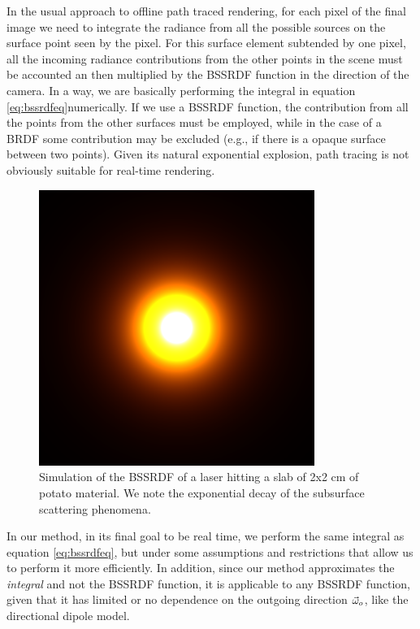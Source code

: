 In the usual approach to offline path traced rendering, for each pixel of the final image we need to integrate the radiance from all the possible sources on the surface point seen by the pixel. For this surface element subtended by one pixel, all the incoming radiance contributions from the other points in the scene must be accounted an then multiplied by the BSSRDF function in the direction of the camera. In a way, we are basically performing the integral in equation \ref{eq:bssrdfeq}numerically. If we use a BSSRDF function, the contribution from all the points from the other surfaces must be employed, while in the case of a BRDF some contribution may be excluded (e.g., if there is a opaque surface between two points). Given its natural exponential explosion, path tracing is not obviously suitable for real-time rendering.


\begin{figure}[!ht]
\centering
\includegraphics[width=0.8\textwidth]{images/bssrdf_slab_potato.png}
\caption{Simulation of the BSSRDF of a laser hitting a slab of 2x2 cm of potato material. We note the exponential decay of the subsurface scattering phenomena.}
\label{fig:slab_potato}
\end{figure}

In our method, in its final goal to be real time, we perform the same integral as equation \ref{eq:bssrdfeq}, but under some assumptions and restrictions that allow us to perform it more efficiently. In addition, since our method approximates the \emph{integral} and not the BSSRDF function, it is applicable to any BSSRDF function, given that it has limited or no dependence on the outgoing direction $\vec{\omega}_o$, like the directional dipole model.

